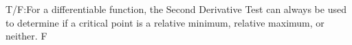 {T/F:For a differentiable function, the Second Derivative Test can always be used to determine if a critical point is a relative minimum, relative maximum, or neither.
}
{F
}
